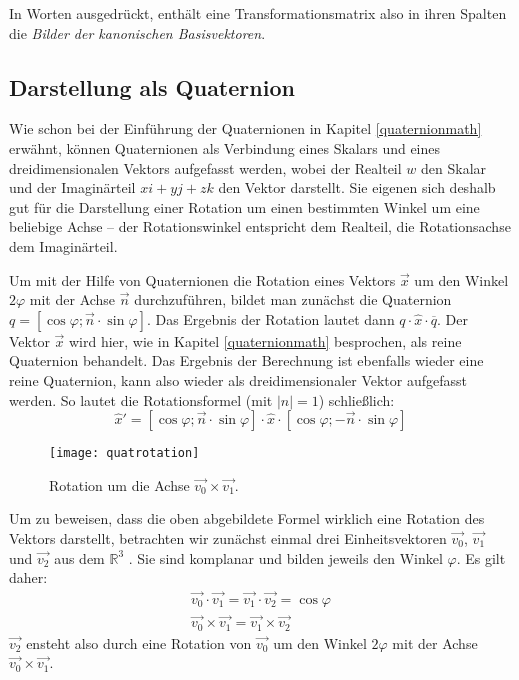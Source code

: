 In Worten ausgedrückt, enthält eine Transformationsmatrix also in ihren Spalten die \emph{Bilder der kanonischen Basisvektoren}.

\subsection{Darstellung als Quaternion}
Wie schon bei der Einführung der Quaternionen in Kapitel \ref{quaternionmath} erwähnt, können Quaternionen als Verbindung eines Skalars und eines dreidimensionalen Vektors aufgefasst werden, wobei der Realteil $w$ den Skalar und der Imaginärteil $xi + yj + zk$ den Vektor  darstellt. Sie eigenen sich deshalb gut für die Darstellung einer Rotation um einen bestimmten Winkel um eine beliebige Achse -- der Rotationswinkel entspricht dem Realteil, die Rotationsachse dem Imaginärteil.

Um mit der Hilfe von Quaternionen die Rotation eines Vektors $\vec x$ um den Winkel $2 \varphi$ mit der Achse $\vec n$ durchzuführen, bildet man zunächst die Quaternion $q = \left[ \cos \varphi; \vec n \cdot \sin \varphi \right]$. Das Ergebnis der Rotation lautet dann $q \cdot \hat{x} \cdot \overline{q}$. Der Vektor $\vec x$ wird hier, wie in Kapitel \ref{quaternionmath} besprochen, als reine Quaternion behandelt. Das Ergebnis der Berechnung ist ebenfalls wieder eine reine Quaternion, kann also wieder als dreidimensionaler Vektor aufgefasst werden. So lautet die Rotationsformel (mit $\left| n \right| = 1$) schließlich:
\begin{equation}
 \hat{x}' = \left[ \cos \varphi; \vec n \cdot \sin \varphi \right] \cdot \hat{x} \cdot \left[ \cos \varphi; -\vec n \cdot \sin \varphi \right]
\end{equation}

\begin{wrapfigure}{r}{0.5\textwidth}
  \vspace{-10pt}
  \texttt{[image: quatrotation]}
  \vspace{-10pt}
  \caption{Rotation um die Achse $\vec{v_0} \times \vec{v_1}$.}
\end{wrapfigure}

Um zu beweisen, dass die oben abgebildete Formel wirklich eine Rotation des Vektors darstellt, betrachten wir zunächst einmal drei Einheitsvektoren $\vec{v_0}$, $\vec{v_1}$ und $\vec{v_2}$ aus dem $\mathbb R^3$ . Sie sind komplanar und bilden jeweils den Winkel $\varphi$. Es gilt daher:
\begin{align}
 \vec{v_0} \cdot \vec{v_1} = \vec{v_1} \cdot \vec{v_2} = \cos \varphi \label{dotsame} \\
 \vec{v_0} \times\vec{v_1} = \vec{v_1} \times \vec{v_2} \label{crosssame}
\end{align}
$\vec{v_2}$ ensteht also durch eine Rotation von $\vec{v_0}$ um den Winkel $2 \varphi$ mit der Achse $\vec{v_0} \times \vec{v_1}$.

